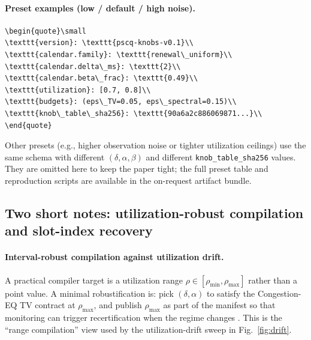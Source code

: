 \documentclass[11pt]{article}
\theoremstyle{definition}
\theoremstyle{remark}
\begin{document}
\paragraph{Preset examples (low / default / high noise).}
\begin{lstlisting}[basicstyle=\ttfamily\small]
\begin{quote}\small
\texttt{version}: \texttt{pscq-knobs-v0.1}\\
\texttt{calendar.family}: \texttt{renewal\_uniform}\\
\texttt{calendar.delta\_ms}: \texttt{2}\\
\texttt{calendar.beta\_frac}: \texttt{0.49}\\
\texttt{utilization}: [0.7, 0.8]\\
\texttt{budgets}: (eps\_TV=0.05, eps\_spectral=0.15)\\
\texttt{knob\_table\_sha256}: \texttt{90a6a2c886069871...}\\
\end{quote}
\end{lstlisting}


\smallskip
\noindent Other presets (e.g., higher observation noise or tighter utilization ceilings) use the same schema with different $(\delta,\alpha,\beta)$ and different \texttt{knob\_table\_sha256} values. They are omitted here to keep the paper tight; the full preset table and reproduction scripts are available in the on-request artifact bundle.

\subsection{Two short notes: utilization-robust compilation and slot-index recovery}
\paragraph{Interval-robust compilation against utilization drift.}
A practical compiler target is a utilization range $\rho\in[\rho_{\min},\rho_{\max}]$ rather than a point value.
A minimal robustification is: pick $(\delta,\alpha)$ to satisfy the Congestion-EQ TV contract at $\rho_{\max}$,
and publish $\rho_{\max}$ as part of the manifest so that monitoring can trigger recertification when the regime changes \cite{series:recert}.
This is the ``range compilation'' view used by the utilization-drift sweep in Fig.~\ref{fig:drift}.
\end{document}
